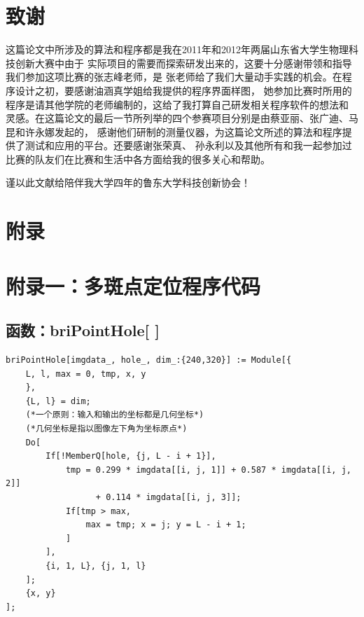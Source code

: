 \documentclass[UTF8,a4paper,12pt]{article}
\begin{document}







\section*{致谢}

这篇论文中所涉及的算法和程序都是我在2011年和2012年两届山东省大学生物理科技创新大赛中由于
实际项目的需要而探索研发出来的，这要十分感谢带领和指导我们参加这项比赛的张志峰老师，是
张老师给了我们大量动手实践的机会。在程序设计之初，要感谢油涵真学姐给我提供的程序界面样图，
她参加比赛时所用的程序是请其他学院的老师编制的，这给了我打算自己研发相关程序软件的想法和
灵感。在这篇论文的最后一节所列举的四个参赛项目分别是由蔡亚丽、张广迪、马昆和许永娜发起的，
感谢他们研制的测量仪器，为这篇论文所述的算法和程序提供了测试和应用的平台。还要感谢张荣真、
孙永利以及其他所有和我一起参加过比赛的队友们在比赛和生活中各方面给我的很多关心和帮助。

谨以此文献给陪伴我大学四年的鲁东大学科技创新协会！

\newpage
{}
\section*{附录}
\appendix

\section{附录一：多斑点定位程序代码}
\subsection{函数：briPointHole[ ]}
\begin{verbatim}
briPointHole[imgdata_, hole_, dim_:{240,320}] := Module[{
    L, l, max = 0, tmp, x, y
    },
    {L, l} = dim;
    (*一个原则：输入和输出的坐标都是几何坐标*)
    (*几何坐标是指以图像左下角为坐标原点*)
    Do[
        If[!MemberQ[hole, {j, L - i + 1}], 
            tmp = 0.299 * imgdata[[i, j, 1]] + 0.587 * imgdata[[i, j, 2]] 
                  + 0.114 * imgdata[[i, j, 3]];
            If[tmp > max,
                max = tmp; x = j; y = L - i + 1;
            ]
        ],
        {i, 1, L}, {j, 1, l}
    ];
    {x, y}
];
\end{verbatim}
\end{document}
